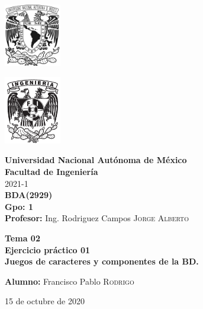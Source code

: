 \documentclass{article}
\newcommand{\materia}{BDA}
\newcommand{\clave}{2929}
\newcommand{\profesor}{Ing. Rodriguez Campos \textsc{Jorge Alberto}}
\newcommand{\semestre}{2021-1}
\newcommand{\alumno}{Francisco Pablo \textsc{Rodrigo}}
\newcommand{\actividad}{Tema 02 \\ Ejercicio práctico 01}
\newcommand{\titulo}{Juegos de caracteres y componentes de la BD.}
\newcommand{\fechaEntrega}{15 de octubre de 2020}
\begin{document}
\thispagestyle{empty}
\begin{minipage}[t][5cm][t]{0.2\linewidth}
    \includegraphics[width=2.5cm]{unam.jpg}
    \vspace{10cm}

    \includegraphics[width=2.5cm]{fiblack}
\end{minipage}
\begin{minipage}[t]{0.7\linewidth}
    \vspace{-2.5cm}
    \LARGE{\textbf{Universidad Nacional Autónoma de México}}\\
    \Large{\textbf{Facultad de Ingeniería}} \\

    \large{\semestre}\\[2cm]

    \large{\textbf{\materia (\clave)}}\\
    \large{\textbf{Gpo: 1}}\\[5mm]
    \large{\textbf{Profesor:} \profesor}\\ [1.5cm]
    \begin{center}
        \LARGE{\textbf{\actividad}}\\
        \LARGE{\textbf{\titulo}}\\
    \end{center}

    \vspace{3.3cm}

    \large{\textbf{Alumno:} \alumno} \\[1.5cm]

    \begin{flushright}
        \fechaEntrega%
    \end{flushright}
\end{minipage}

\newpage
\end{document}
